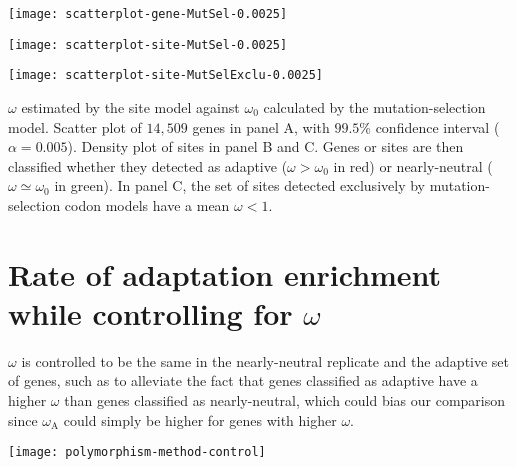 \documentclass{article}
\begin{document}
\begin{center}
    \begin{minipage}{0.32\linewidth}
        \texttt{[image: scatterplot-gene-MutSel-0.0025]}
    \end{minipage}
    \hfill
    \begin{minipage}{0.32\linewidth}
        \texttt{[image: scatterplot-site-MutSel-0.0025]}
    \end{minipage}
    \hfill
    \begin{minipage}{0.32\linewidth}
        \texttt{[image: scatterplot-site-MutSelExclu-0.0025]}
    \end{minipage}
    \hfill
\end{center}

$\omega$ estimated by the site model against $\omega_{0}$ calculated by the mutation-selection model.
Scatter plot of $14,509$ genes in panel A, with $99.5$\% confidence interval ($\alpha=0.005$).
Density plot of sites in panel B and C.
Genes or sites are then classified whether they detected as adaptive ($\omega > \omega_{0}$ in red) or nearly-neutral ($\omega \simeq \omega_{0}$ in green).
In panel C, the set of sites detected exclusively by mutation-selection codon models have a mean $\omega < 1 $.



\pagebreak
\section{Rate of adaptation enrichment while controlling for $\omega$}
\label{sec:controlling-for-omega}

$\omega$ is controlled to be the same in the nearly-neutral replicate and the adaptive set of genes, such as to alleviate the fact that genes classified as adaptive have a higher $\omega$ than genes classified as nearly-neutral, which could bias our comparison since $\omega_{\mathrm{A}}$ could simply be higher for genes with higher $\omega$.

\begin{center}
    \texttt{[image: polymorphism-method-control]}
\end{center}
\end{document}

